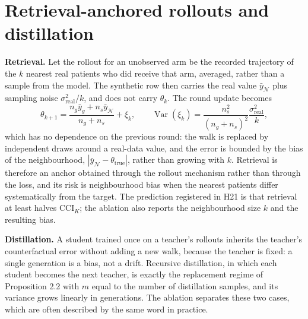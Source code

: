 \documentclass[11pt,a4paper]{article}
\newcommand{\Var}{\operatorname{Var}}
\newcommand{\CCI}{\mathrm{CCI}}
\begin{document}
\section{Retrieval-anchored rollouts and distillation}
\textbf{Retrieval.} Let the rollout for an unobserved arm be the recorded trajectory of the $k$ nearest real patients who did receive that arm, averaged, rather than a sample from the model. The synthetic row then carries the real value $\bar y_{\mathcal N}$ plus sampling noise $\sigma^2_{\mathrm{real}}/k$, and does not carry $\theta_k$. The round update becomes
\begin{equation}
\theta_{k+1}=\frac{n_g\bar y_g+n_s\bar y_{\mathcal N}}{n_g+n_s}+\xi_k,\qquad \Var(\xi_k)=\frac{n_s^2}{(n_g+n_s)^2}\frac{\sigma^2_{\mathrm{real}}}{k},
\end{equation}
which has no dependence on the previous round: the walk is replaced by independent draws around a real-data value, and the error is bounded by the bias of the neighbourhood, $|\bar y_{\mathcal N}-\theta_{\mathrm{true}}|$, rather than growing with $k$. Retrieval is therefore an anchor obtained through the rollout mechanism rather than through the loss, and its risk is neighbourhood bias when the nearest patients differ systematically from the target. The prediction registered in H21 is that retrieval at least halves $\CCI_K$; the ablation also reports the neighbourhood size $k$ and the resulting bias.

\textbf{Distillation.} A student trained once on a teacher's rollouts inherits the teacher's counterfactual error without adding a new walk, because the teacher is fixed: a single generation is a bias, not a drift. Recursive distillation, in which each student becomes the next teacher, is exactly the replacement regime of Proposition 2.2 with $m$ equal to the number of distillation samples, and its variance grows linearly in generations. The ablation separates these two cases, which are often described by the same word in practice.
\end{document}
